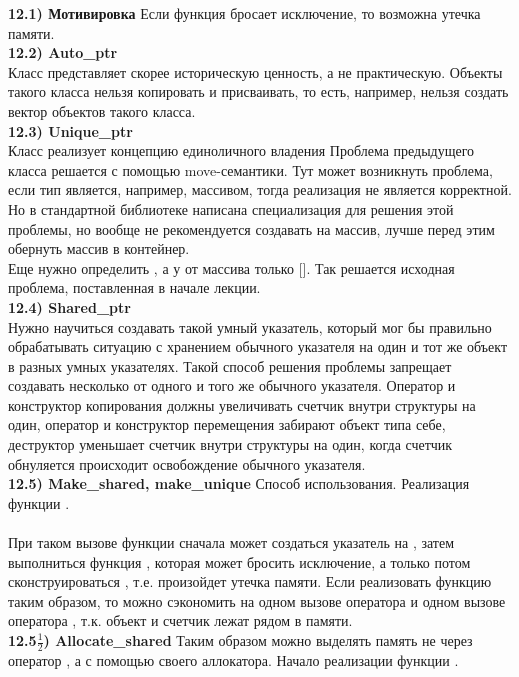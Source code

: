\documentclass{article}
\begin{document}
\noindent \textbf{12.1) Мотивировка}
Если функция  бросает исключение, то возможна утечка памяти.\\
\noindent \textbf{12.2) Auto\_ptr}\\
Класс представляет скорее историческую ценность, а не практическую.
Объекты такого класса нельзя копировать и присваивать, то есть, например, нельзя создать вектор объектов такого класса.\\
\noindent \textbf{12.3) Unique\_ptr}\\
Класс реализует концепцию единоличного владения
Проблема предыдущего класса решается с помощью move-семантики. Тут может возникнуть проблема, если тип  является, например, массивом, тогда реализация не является корректной.
Но в стандартной библиотеке написана специализация для решения этой проблемы, но вообще не рекомендуется создавать  на массив, лучше перед этим обернуть массив в контейнер.\\
Еще нужно определить , а у  от массива только [].
Так решается исходная проблема, поставленная в начале лекции.\\
\noindent \textbf{12.4) Shared\_ptr}\\
Нужно научиться создавать такой умный указатель, который мог бы правильно обрабатывать ситуацию с хранением обычного указателя на один и тот же объект в разных умных указателях. 
Такой способ решения проблемы запрещает создавать несколько  от одного и того же обычного указателя. Оператор и конструктор копирования должны увеличивать счетчик внутри структуры  на один, оператор и конструктор перемещения забирают объект типа  себе, деструктор уменьшает счетчик внутри структуры  на один, когда счетчик обнуляется происходит освобождение обычного указателя.\\
\noindent \textbf{12.5) Make\_shared, make\_unique}
Способ использования.
Реализация функции .\\\\
При таком вызове функции  сначала может создаться указатель на , затем выполниться функция , которая может бросить исключение, а только потом сконструироваться , т.е. произойдет утечка памяти.
Если реализовать функцию  таким образом, то можно сэкономить на одном вызове оператора  и одном вызове оператора , т.к. объект и счетчик лежат рядом в памяти.\\
\noindent \textbf{12.5$\frac{1}{2}$) Allocate\_shared}
Таким образом можно выделять память не через оператор , а с помощью своего аллокатора.
Начало реализации функции .
\end{document}

